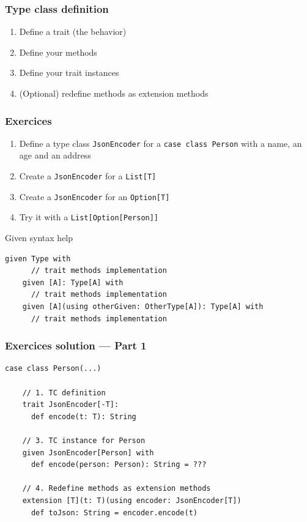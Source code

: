\begin{frame}
  \frametitle{Type class definition}

  \begin{enumerate}
    \item Define a trait (the behavior)
    \item Define your methods
    \item Define your trait instances
    \item (Optional) redefine methods as extension methods
  \end{enumerate}
\end{frame}

\begin{frame}[fragile]
  \frametitle{Exercices}

  \begin{enumerate}
    \item Define a type class \texttt{JsonEncoder} for a \texttt{case class Person} with a name, an age and an address
    \item Create a \texttt{JsonEncoder} for a \texttt{List[T]}
    \item Create a \texttt{JsonEncoder} for an \texttt{Option[T]}
    \item Try it with a \texttt{List[Option[Person]]}
  \end{enumerate}

  Given syntax help
  \begin{lstlisting}[gobble=4]
    given Type with
      // trait methods implementation
    given [A]: Type[A] with
      // trait methods implementation
    given [A](using otherGiven: OtherType[A]): Type[A] with
      // trait methods implementation
  \end{lstlisting}
\end{frame}

\begin{frame}[fragile]
  \frametitle{Exercices solution --- Part 1}

  \begin{lstlisting}[gobble=4]
    case class Person(...)
    
    // 1. TC definition
    trait JsonEncoder[-T]:
      def encode(t: T): String 

    // 3. TC instance for Person
    given JsonEncoder[Person] with
      def encode(person: Person): String = ???

    // 4. Redefine methods as extension methods
    extension [T](t: T)(using encoder: JsonEncoder[T])
      def toJson: String = encoder.encode(t)
  \end{lstlisting}

\end{frame}


